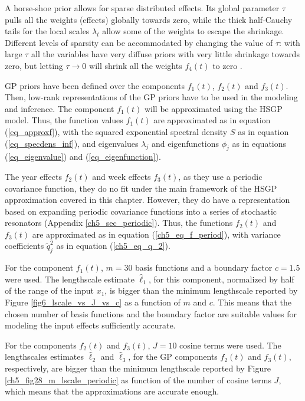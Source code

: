 \documentclass[onecolumn,a4paper,11pt]{article}
\begin{document}
\noindent A horse-shoe prior allows for sparse distributed effects. Its global parameter $\tau$ pulls all the weights (effects) globally towards zero, while the thick half-Cauchy tails for the local scales $\lambda_t$ allow some of the weights to escape the shrinkage. Different levels of sparsity can be accommodated by changing the value of $\tau$: with large $\tau$ all the variables have very diffuse priors with very little shrinkage towards zero, but letting $\tau \rightarrow 0$ will shrink all the weights $f_4(t)$ to zero \citep{piironen2016hyperprior}. 

GP priors have been defined over the components $f_1(t)$, $f_2(t)$ and $f_3(t)$. Then, low-rank representations of the GP priors have to be used in the modeling and inference. The component $f_1(t)$ will be approximated using the HSGP model. Thus, the function values $f_1(t)$ are approximated as in equation (\ref{eq_approxf}), with the squared exponential spectral density $S$ as in equation (\ref{eq_specdens_inf}), and eigenvalues $\lambda_j$  and eigenfunctions $\phi_j$ as in equations (\ref{eq_eigenvalue}) and (\ref{eq_eigenfunction}). 

The year effects $f_2(t)$ and week effects $f_3(t)$, as they use a periodic covariance function, they do no fit under the main framework of the HSGP approximation covered in this chapter. However, they do have a representation based on expanding periodic covariance functions into a series of stochastic resonators (Appendix \ref{ch5_sec_periodic}). Thus, the functions $f_2(t)$ and $f_3(t)$ are approximated as in equation (\ref{ch5_eq_f_period}), with variance coefficients $\tilde{q}_j^2$ as in equation (\ref{ch5_eq_q_2}).

For the component $f_1(t)$, $m=30$ basis functions and a boundary factor $c=1.5$ were used. The lengthscale estimate $\hat{\ell}_1$, for this component, normalized by half of the range of the input $x_1$, is bigger than the minimum lengthscale reported by Figure \ref{fig6_lscale_vs_J_vs_c} as a function of $m$ and $c$. This means that the chosen number of basis functions and the boundary factor are suitable values for modeling the input effects sufficiently accurate. 

For the components $f_2(t)$ and $f_3(t)$, $J=10$ cosine terms were used. The  lengthscales estimates $\hat{\ell}_2$ and $\hat{\ell}_3$, for the GP components $f_2(t)$ and $f_3(t)$, respectively, are bigger than the minimum lengthscale reported by Figure \ref{ch5_fig28_m_lscale_periodic} as function of the number of cosine terms $J$, which means that the approximations are accurate enough.
\end{document}
